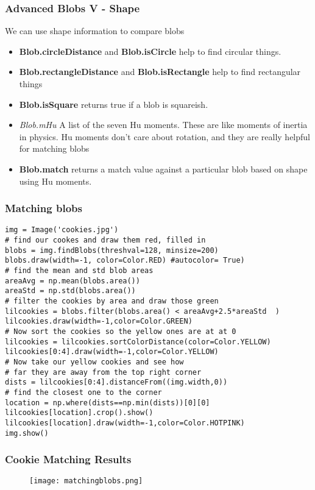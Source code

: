 \documentclass[compress]{beamer}
\begin{document}
\begin{frame}
  \frametitle{Advanced Blobs V - Shape}
We can use shape information to compare blobs
\begin{itemize}
\item \textbf{Blob.circleDistance} and \textbf{Blob.isCircle} help to
  find circular things.
\item \textbf{Blob.rectangleDistance} and \textbf{Blob.isRectangle} help to
  find rectangular things
\item \textbf{Blob.isSquare} returns true if a blob is squareish. 
\item \textit{Blob.mHu} A list of the seven Hu moments. These are like
  moments of inertia in physics. Hu moments don't care about
  rotation, and they are really helpful for matching blobs
\item \textbf{Blob.match} returns a match value against a particular
  blob based on shape using Hu moments.
\end{itemize}
\end{frame}
\begin{frame}[fragile] 
\frametitle{Matching blobs}
\begin{example}
\begin{verbatim}
img = Image('cookies.jpg')
# find our cookes and draw them red, filled in
blobs = img.findBlobs(threshval=128, minsize=200)
blobs.draw(width=-1, color=Color.RED) #autocolor= True)
# find the mean and std blob areas
areaAvg = np.mean(blobs.area())
areaStd = np.std(blobs.area())
# filter the cookies by area and draw those green
lilcookies = blobs.filter(blobs.area() < areaAvg+2.5*areaStd  )
lilcookies.draw(width=-1,color=Color.GREEN)
# Now sort the cookies so the yellow ones are at at 0
lilcookies = lilcookies.sortColorDistance(color=Color.YELLOW)
lilcookies[0:4].draw(width=-1,color=Color.YELLOW)
# Now take our yellow cookies and see how
# far they are away from the top right corner
dists = lilcookies[0:4].distanceFrom((img.width,0))
# find the closest one to the corner
location = np.where(dists==np.min(dists))[0][0]
lilcookies[location].crop().show()
lilcookies[location].draw(width=-1,color=Color.HOTPINK)
img.show()
\end{verbatim}
\end{example}
\end{frame} 
\begin{frame}
\frametitle{Cookie Matching Results}
 \begin{figure}
     \texttt{[image: matchingblobs.png]}
 \end{figure}
\end{frame}
\end{document}
